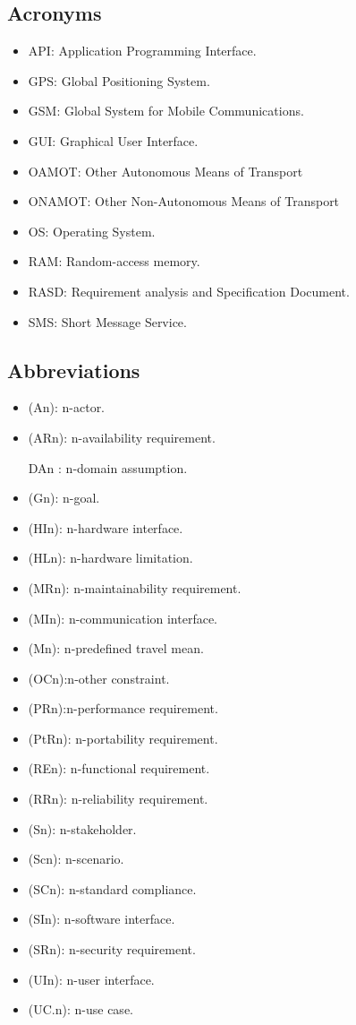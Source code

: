 \documentclass[a4paper,leqno]{book}
\begin{document}
\subsection{Acronyms}
\begin{itemize}
	\item API: Application Programming Interface.
	\item GPS: Global Positioning System.
	\item GSM: Global System for Mobile Communications.
	\item GUI: Graphical User Interface.
	\item OAMOT: Other Autonomous Means of Transport
	\item ONAMOT: Other Non-Autonomous Means of Transport
	\item OS: Operating System.
	\item RAM: Random-access memory.
	\item RASD: Requirement analysis and Specification Document.
	\item SMS: Short Message Service.
\end{itemize}


\subsection{Abbreviations}
\begin{itemize}
	\item (An): n-actor.
	\item (ARn): n-availability requirement.
	\item [DAn]: n-domain assumption.
	\item (Gn): n-goal.
	\item (HIn): n-hardware interface.
	\item (HLn): n-hardware limitation.
	\item (MRn): n-maintainability requirement.
	\item (MIn): n-communication interface.
	\item (Mn): n-predefined travel mean.
	\item (OCn):n-other constraint.
	\item (PRn):n-performance requirement.
	\item (PtRn): n-portability requirement.
	\item (REn): n-functional requirement.
	\item (RRn): n-reliability requirement.
	\item (Sn): n-stakeholder.
	\item (Scn): n-scenario.
	\item (SCn): n-standard compliance.
	\item (SIn): n-software interface.
	\item (SRn): n-security requirement.
	\item (UIn): n-user interface.
	\item (UC.n): n-use case.
	
\end{itemize}
\end{document}
